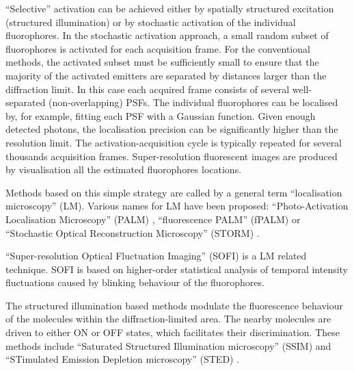 ``Selective'' activation can be achieved either by spatially structured excitation (structured illumination) or by stochastic activation of the individual fluorophores. In the stochastic activation approach, a small random subset of fluorophores is activated for each acquisition frame. For the conventional methods, the activated subset must be sufficiently small to ensure that the majority of the activated emitters are separated by distances larger than the diffraction limit. In this case each acquired frame consists of several well-separated (non-overlapping) PSFs. The individual fluorophores can be localised by, for example, fitting each PSF with a Gaussian function. Given enough detected photons, the localisation precision can be significantly higher than the resolution limit. The activation-acquisition cycle is typically repeated for several thousands acquisition frames. Super-resolution fluorescent images are produced by visualisation all the estimated fluorophores locations. 

Methods based on this simple strategy are called by a general term ``localisation microscopy'' (LM). Various names for LM have been proposed: ``Photo-Activation Localisation Microscopy'' (PALM) \cite{Betzig2006}, ``fluorescence PALM'' (fPALM) \cite{Hess2006} or ``Stochastic Optical Reconstruction Microscopy'' (STORM) \cite{Rust2006}.  

``Super-resolution Optical Fluctuation Imaging'' (SOFI) \cite{Dertinger2009} is a LM related technique. SOFI is based on higher-order statistical analysis of temporal intensity fluctuations caused by blinking behaviour of the fluorophores.


The structured illumination based methods modulate the fluorescence behaviour of the molecules within the diffraction-limited area. The nearby molecules are driven to either ON or OFF states, which facilitates their discrimination.  These methods include ``Saturated Structured Illumination microscopy'' (SSIM) \cite{Gustafsson2000,Heintzmann2002} and ``STimulated Emission Depletion microscopy'' (STED) \cite{Hell1994}. 



